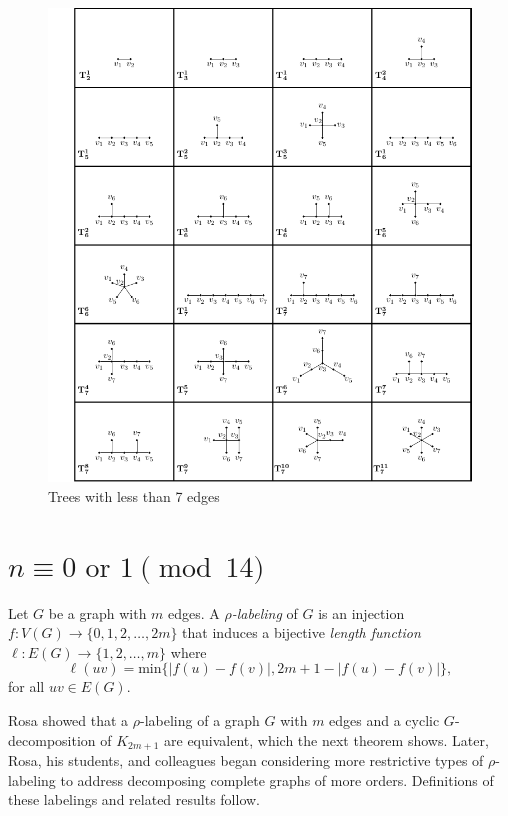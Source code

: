 \documentclass{dmgt}
\begin{document}
\begin{figure}[H]
    \centering
    \includegraphics[]{tree chart.pdf}
    \caption{Trees with less than 7 edges}
    \label{fig:catalog}
\end{figure}

\section{$n \equiv 0 \textrm{ or } 1 \pmod{14}$}\label{sec:0 or 1 mod 14}




\begin{dnt} \label{def:rho} 
 Let $G$ be a graph with $m$ edges.  A \textit{$\rho$-labeling} of $G$ is an injection $f: V(G) \rightarrow \{0,1,2, \dots, 2m\}$ that induces a bijective \textit{length function $\ell: E(G) \rightarrow \{1,2, \dots, m\}$} where 
    $$
    \ell(uv) = \text{min}\{|f(u)-f(v)|,2m+1-|f(u)-f(v)|\},
    $$
for all  $uv \in E(G)$.
\end{dnt}

Rosa showed that a $\rho$-labeling of a graph $G$ with $m$ edges and a cyclic $G$-decomposition of $K_{2m+1}$ are equivalent, which the next theorem shows. Later, Rosa, his students, and colleagues began considering more restrictive types of $\rho$-labeling to address decomposing complete graphs of more orders. Definitions of these labelings and related results follow.
\end{document}

